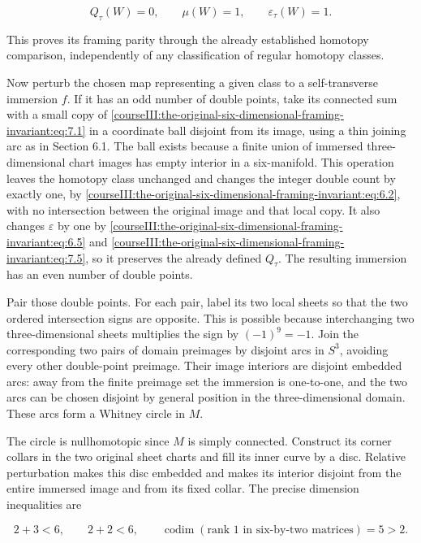 \begin{equation}
Q_\tau(W)=0,\qquad \mu(W)=1,\qquad
                                      \varepsilon_\tau(W)=1.
 \label{courseIII:the-original-six-dimensional-framing-invariant:eq:7.5}
\end{equation}

This proves its framing parity through the already established homotopy comparison, independently of any classification of regular homotopy classes.

Now perturb the chosen map representing a given class to a self-transverse immersion \(f\). If it has an odd number of double points, take its connected sum with a small copy of \eqref{courseIII:the-original-six-dimensional-framing-invariant:eq:7.1} in a coordinate ball disjoint from its image, using a thin joining arc as in Section 6.1. The ball exists because a finite union of immersed three-dimensional chart images has empty interior in a six-manifold. This operation leaves the homotopy class unchanged and changes the integer double count by exactly one, by \eqref{courseIII:the-original-six-dimensional-framing-invariant:eq:6.2}, with no intersection between the original image and that local copy. It also changes \(\varepsilon\) by one by \eqref{courseIII:the-original-six-dimensional-framing-invariant:eq:6.5} and \eqref{courseIII:the-original-six-dimensional-framing-invariant:eq:7.5}, so it preserves the already defined \(Q_\tau\). The resulting immersion has an even number of double points.

Pair those double points. For each pair, label its two local sheets so that the two ordered intersection signs are opposite. This is possible because interchanging two three-dimensional sheets multiplies the sign by \((-1)^9=-1\). Join the corresponding two pairs of domain preimages by disjoint arcs in \(S^3\), avoiding every other double-point preimage. Their image interiors are disjoint embedded arcs: away from the finite preimage set the immersion is one-to-one, and the two arcs can be chosen disjoint by general position in the three-dimensional domain. These arcs form a Whitney circle in \(M\).

The circle is nullhomotopic since \(M\) is simply connected. Construct its corner collars in the two original sheet charts and fill its inner curve by a disc. Relative perturbation makes this disc embedded and makes its interior disjoint from the entire immersed image and from its fixed collar. The precise dimension inequalities are

\begin{equation}
2+3<6,\qquad 2+2<6,\qquad
                 \operatorname{codim}(\text{rank }1
                          \text{ in six-by-two matrices})=5>2.
 \label{courseIII:the-original-six-dimensional-framing-invariant:eq:7.6}
\end{equation}


